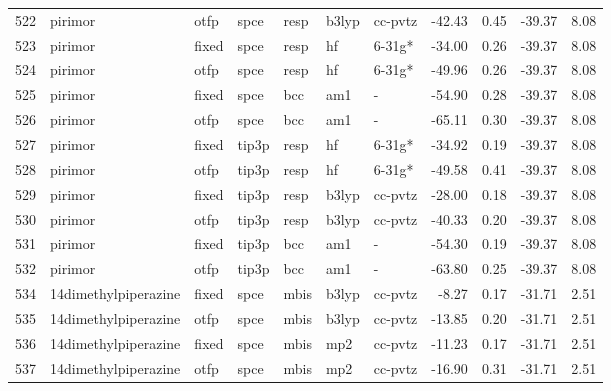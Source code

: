 \begin{tabular}{lllllllrrrr}
522 &                       pirimor &   otfp &   spce &   resp &   b3lyp &      cc-pvtz &      -42.43 &     0.45 &      -39.37 &      8.08 \\
523 &                       pirimor &  fixed &   spce &   resp &      hf &       6-31g* &      -34.00 &     0.26 &      -39.37 &      8.08 \\
524 &                       pirimor &   otfp &   spce &   resp &      hf &       6-31g* &      -49.96 &     0.26 &      -39.37 &      8.08 \\
525 &                       pirimor &  fixed &   spce &    bcc &     am1 &            - &      -54.90 &     0.28 &      -39.37 &      8.08 \\
526 &                       pirimor &   otfp &   spce &    bcc &     am1 &            - &      -65.11 &     0.30 &      -39.37 &      8.08 \\
527 &                       pirimor &  fixed &  tip3p &   resp &      hf &       6-31g* &      -34.92 &     0.19 &      -39.37 &      8.08 \\
528 &                       pirimor &   otfp &  tip3p &   resp &      hf &       6-31g* &      -49.58 &     0.41 &      -39.37 &      8.08 \\
529 &                       pirimor &  fixed &  tip3p &   resp &   b3lyp &      cc-pvtz &      -28.00 &     0.18 &      -39.37 &      8.08 \\
530 &                       pirimor &   otfp &  tip3p &   resp &   b3lyp &      cc-pvtz &      -40.33 &     0.20 &      -39.37 &      8.08 \\
531 &                       pirimor &  fixed &  tip3p &    bcc &     am1 &            - &      -54.30 &     0.19 &      -39.37 &      8.08 \\
532 &                       pirimor &   otfp &  tip3p &    bcc &     am1 &            - &      -63.80 &     0.25 &      -39.37 &      8.08 \\
534 &          14dimethylpiperazine &  fixed &   spce &   mbis &   b3lyp &      cc-pvtz &       -8.27 &     0.17 &      -31.71 &      2.51 \\
535 &          14dimethylpiperazine &   otfp &   spce &   mbis &   b3lyp &      cc-pvtz &      -13.85 &     0.20 &      -31.71 &      2.51 \\
536 &          14dimethylpiperazine &  fixed &   spce &   mbis &     mp2 &      cc-pvtz &      -11.23 &     0.17 &      -31.71 &      2.51 \\
537 &          14dimethylpiperazine &   otfp &   spce &   mbis &     mp2 &      cc-pvtz &      -16.90 &     0.31 &      -31.71 &      2.51 \\

\end{tabular}
